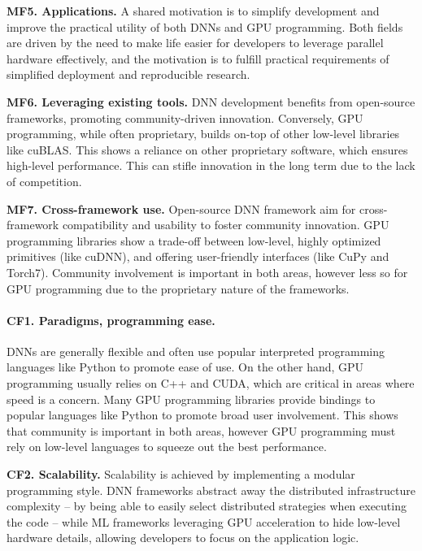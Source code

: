 \textbf{MF5. Applications.}
A shared motivation is to simplify development and improve the practical utility of both DNNs and GPU programming.
Both fields are driven by the need to make life easier for developers to leverage parallel hardware effectively,
and the motivation is to fulfill practical requirements of simplified deployment and reproducible research.

\textbf{MF6. Leveraging existing tools.}
DNN development benefits from open-source frameworks, promoting community-driven innovation. Conversely, GPU programming,
while often proprietary, builds on-top of other low-level libraries like cuBLAS. This shows a reliance on other
proprietary software, which ensures high-level performance. This can stifle innovation in the long term due
to the lack of competition.

\textbf{MF7. Cross-framework use.}
Open-source DNN framework aim for cross-framework compatibility and usability to foster community innovation.
GPU programming libraries show a trade-off between low-level, highly optimized primitives (like cuDNN), and offering
user-friendly interfaces (like CuPy and Torch7). Community involvement is important in both areas, however
less so for GPU programming due to the proprietary nature of the frameworks.

\paragraph{CF1. Paradigms, programming ease.}
DNNs are generally flexible and often use popular interpreted programming languages like Python to
promote ease of use. On the other hand, GPU programming usually relies on C++ and CUDA, which are
critical in areas where speed is a concern. Many GPU programming libraries provide bindings to
popular languages like Python to promote broad user involvement. This shows that community is
important in both areas, however GPU programming must rely on low-level languages to squeeze out
the best performance.

\textbf{CF2. Scalability.}
Scalability is achieved by implementing a modular programming style. DNN frameworks
abstract away the distributed infrastructure complexity -- by being able to easily select distributed
strategies when executing the code -- while ML frameworks leveraging GPU acceleration to hide
low-level hardware details, allowing developers to focus on the application logic.





